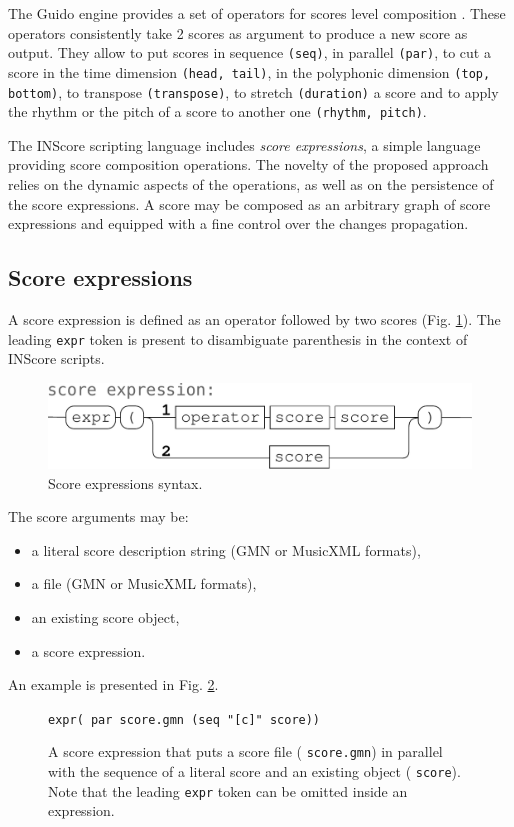 \documentclass[11pt,a4paper]{article}
\newcommand{\OSC}[1]	{{\fontsize{10pt}{10pt} \selectfont\texttt{#1}}}
\newcommand{\sample}[1]	{\vspace{-0.2em}\begin{center}\colorbox{mygrey}{\begin{minipage}[t]{0.98\columnwidth} {\small \texttt{#1}}\end{minipage}}\end{center}}
\begin{document}
The Guido engine provides a set of operators for scores level composition \cite{fober12b}. These operators consistently take 2 scores as argument to produce a new score as output. They allow to put scores in sequence \OSC{(seq)}, in parallel \OSC{(par)}, to cut a score in the time dimension \OSC{(head, tail)}, in the polyphonic dimension \OSC{(top, bottom)}, to transpose \OSC{(transpose)}, to stretch \OSC{(duration)} a score and to apply the rhythm or the pitch of a score to another one \OSC{(rhythm, pitch)}.

The INScore scripting language includes \emph{score expressions}, a simple language providing score composition operations. 
The novelty of the proposed approach relies on the dynamic aspects of the operations, as well as on the persistence of the score expressions. A score may be composed as an arbitrary graph of score expressions and equipped with a fine control over the changes propagation.

\subsection{Score expressions}

A score expression is defined as an operator followed by two scores (Fig. \ref{fig:scexpr}). The leading \OSC{expr} token is present to disambiguate parenthesis in the context of INScore scripts.
\begin{figure}[ht]
\begin{center}
	\includegraphics[width=1.\columnwidth]{imgs/score-expr}
\caption{Score expressions syntax.}
\label{fig:scexpr}
\end{center}
\end{figure}

The score arguments may be:
\begin{itemize}
\item a literal score description string (GMN or MusicXML formats),
\item a file (GMN or MusicXML formats),
\item an existing score object,
\item a score expression.
\end{itemize}
An example is presented in Fig. \ref{fig:scex1}.
\begin{figure}[ht]
\begin{center}
\sample{expr( par score.gmn (seq "[c]" score))
}
\caption{A score expression that puts a score file (\OSC{score.gmn}) in parallel with the sequence of a literal score and an existing object (\OSC{score}). Note that the leading \OSC{expr} token can be omitted inside an expression.}
\label{fig:scex1}
\end{center}
\end{figure}
\end{document}
